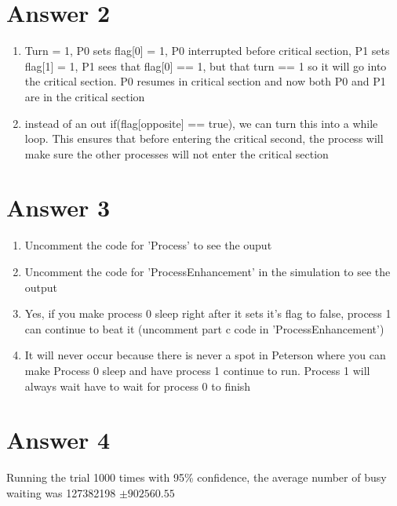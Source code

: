 \documentclass[11pt]{article}
\theoremstyle{definition}
\begin{document}
\section*{Answer 2}
\begin{enumerate}
	\item Turn = 1, P0 sets flag[0] = 1, P0 interrupted before critical section, P1 sets flag[1] = 1, P1 sees that flag[0] == 1, but that turn == 1 so it will go into the critical section.  P0 resumes in critical section and now both P0 and P1 are in the critical section

	\item instead of an out if(flag[opposite] == true), we can turn this into a while loop.  This ensures that before entering the critical second, the process will make sure the other processes will not enter the critical section
\end{enumerate}

\section*{Answer 3}
\begin{enumerate}
	\item Uncomment the code for 'Process' to see the ouput
	\item Uncomment the code for 'ProcessEnhancement' in the simulation to see the output
	\item Yes, if you make process 0 sleep right after it sets it's flag to false, process 1 can continue to beat it (uncomment part c code in 'ProcessEnhancement')

	\item It will never occur because there is never a spot in Peterson where you can make Process 0 sleep and have process 1 continue to run.  Process 1 will always wait have to wait for process 0 to finish
\end{enumerate}

\section*{Answer 4}
Running the trial 1000 times with 95\% confidence, the average number of busy waiting was 127382198 $\pm 902560.55$
\end{document}
